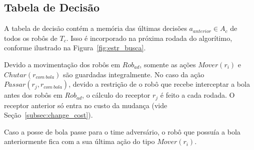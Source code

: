 \subsection{Tabela de Decisão}\label{sec:tab_dec}

A tabela de decisão contém a memória das últimas decisões $a_{anterior} \in A_c$
de todos os robôs de $T_c$.  Isso é incorporado na próxima rodada do algorítimo,
conforme ilustrado na Figura~\ref{fig:estr_busca}.


Devido a movimentação dos robôs em $Rob_{ad}$, somente as ações $Mover(r_i)$ e
$Chutar(r_{com{\ }bola})$ são guardadas integralmente. No caso da ação
$Passar(r_j, r_{com{\ }bola})$, devido a restrição de o robô que recebe
interceptar a bola antes dos robôs em $Rob_{ad}$, o cálculo do receptor $r_j$ é
feito a cada rodada. O receptor anterior só entra no custo da mudança (vide
Seção~\ref{subsec:change_cost}).

Caso a posse de bola passe para o time adversário, o robô que possuía a bola
anteriormente fica com a sua última ação do tipo $Mover(r_i)$.

